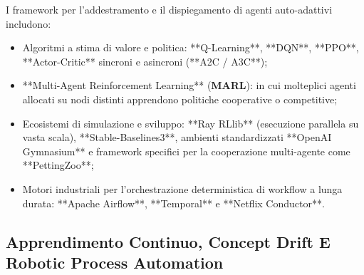 \documentclass[11pt, a4paper]{article}
\begin{document}
I framework per l'addestramento e il dispiegamento di agenti auto-adattivi includono:
\begin{itemize}
    \item Algoritmi a stima di valore e politica: **Q-Learning**, **DQN**, **PPO**, **Actor-Critic** sincroni e asincroni (**A2C / A3C**);
    \item **Multi-Agent Reinforcement Learning** (\textbf{MARL}): in cui molteplici agenti allocati su nodi distinti apprendono politiche cooperative o competitive;
    \item Ecosistemi di simulazione e sviluppo: **Ray RLlib** (esecuzione parallela su vasta scala), **Stable-Baselines3**, ambienti standardizzati **OpenAI Gymnasium** e framework specifici per la cooperazione multi-agente come **PettingZoo**;
    \item Motori industriali per l'orchestrazione deterministica di workflow a lunga durata: **Apache Airflow**, **Temporal** e **Netflix Conductor**.
\end{itemize}


\subsection{Apprendimento Continuo, Concept Drift E Robotic Process Automation}
\end{document}
